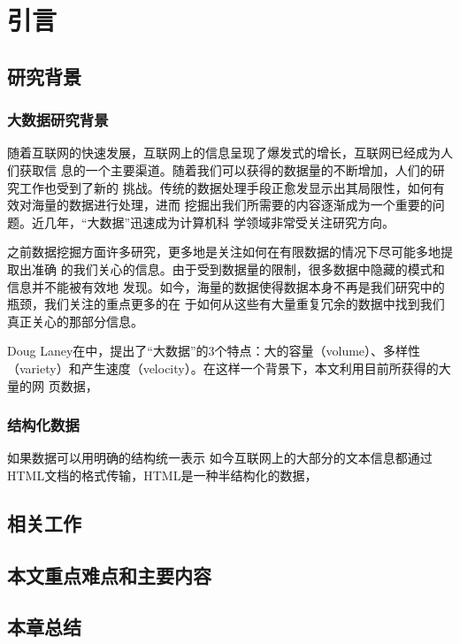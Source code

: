 
\chapter{引言}
\label{chap:intro}

\section{研究背景}
\label{sec:background}
\subsection{大数据研究背景}
随着互联网的快速发展，互联网上的信息呈现了爆发式的增长，互联网已经成为人们获取信
息的一个主要渠道。随着我们可以获得的数据量的不断增加，人们的研究工作也受到了新的
挑战。传统的数据处理手段正愈发显示出其局限性，如何有效对海量的数据进行处理，进而
挖掘出我们所需要的内容逐渐成为一个重要的问题。近几年，“大数据”迅速成为计算机科
学领域非常受关注研究方向。

之前数据挖掘方面许多研究，更多地是关注如何在有限数据的情况下尽可能多地提取出准确
的我们关心的信息。由于受到数据量的限制，很多数据中隐藏的模式和信息并不能被有效地
发现。如今，海量的数据使得数据本身不再是我们研究中的瓶颈，我们关注的重点更多的在
于如何从这些有大量重复冗余的数据中找到我们真正关心的那部分信息。

Doug Laney在\cite{3V}中，提出了“大数据”的3个特点：大的容量（volume）、多样性
（variety）和产生速度（velocity）。在这样一个背景下，本文利用目前所获得的大量的网
页数据，

\subsection{结构化数据}
\label{sec:structuredata}
如果数据可以用明确的结构统一表示
如今互联网上的大部分的文本信息都通过HTML文档的格式传输，HTML是一种半结构化的数据，

\section{相关工作}
\label{sec:relatedwork}

\section{本文重点难点和主要内容}
\label{sec:mainwork}

\section{本章总结}
\label{sec:summaryintro}


